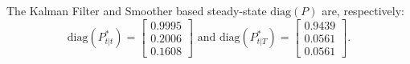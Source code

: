 \documentclass[a4paper,12pt]{article}
\begin{document}
The Kalman Filter and Smoother based steady-state $\mathrm{diag}(P)$ are,
respectively:%
\begin{equation}
\mathrm{diag}(P_{t|t}^{\ast })=%
\begin{bmatrix}
0.9995 \\ 
0.2006 \\ 
0.1608%
\end{bmatrix}%
\text{ \ and \ }\mathrm{diag}(P_{t|T}^{\ast })=%
\begin{bmatrix}
0.9439 \\ 
0.0561 \\ 
0.0561%
\end{bmatrix}%
.
\end{equation}
\end{document}
